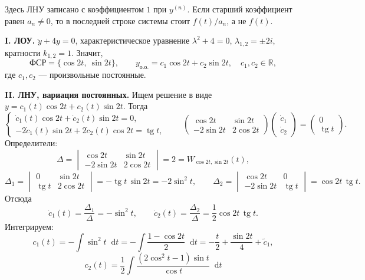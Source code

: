 \documentclass[12pt,a4paper]{article}
\numberwithin{equation}{section}
\newcommand{\R}{\mathbb{R}}
\newcommand{\dd}{\mathop{}\!\mathrm{d}}
\begin{document}
\begin{remarkHSE}
Здесь ЛНУ записано с коэффициентом \(1\) при \(y^{(n)}\). Если старший коэффициент равен \(a_n\neq0\), то в последней строке системы стоит \(f(t)/a_n\), а не \(f(t)\).
\end{remarkHSE}

\begin{exampleHSE}[№\,578: \(\ddot y+4y=\operatorname{tg}t\)]
\textbf{I. ЛОУ.} \(\ddot y+4y=0\), характеристическое уравнение \(\lambda^2+4=0\), \(\lambda_{1,2}=\pm2i\), кратности \(k_{1,2}=1\). Значит,
\[
\text{ФСР}=\{\cos2t,\ \sin2t\},\qquad
y_{\text{о.о.}}=c_1\cos2t+c_2\sin2t,\quad c_1,c_2\in\R,
\]
где \(c_1,c_2\) --- произвольные постоянные.

\textbf{II. ЛНУ, вариация постоянных.} Ищем решение в виде \(y=c_1(t)\cos2t+c_2(t)\sin2t\). Тогда
\[
\begin{cases}
\dot c_1(t)\cos2t+\dot c_2(t)\sin2t=0,\\
-2\dot c_1(t)\sin2t+2\dot c_2(t)\cos2t=\operatorname{tg}t,
\end{cases}
\qquad
\begin{pmatrix}\cos2t&\sin2t\\-2\sin2t&2\cos2t\end{pmatrix}
\begin{pmatrix}\dot c_1\\\dot c_2\end{pmatrix}
=\begin{pmatrix}0\\\operatorname{tg}t\end{pmatrix}.
\]
Определители:
\[
\Delta=\begin{vmatrix}\cos2t&\sin2t\\-2\sin2t&2\cos2t\end{vmatrix}=2=W_{\cos2t,\sin2t}(t),
\]
\[
\Delta_1=\begin{vmatrix}0&\sin2t\\\operatorname{tg}t&2\cos2t\end{vmatrix}=-\operatorname{tg}t\,\sin2t=-2\sin^2t,
\qquad
\Delta_2=\begin{vmatrix}\cos2t&0\\-2\sin2t&\operatorname{tg}t\end{vmatrix}=\cos2t\,\operatorname{tg}t.
\]
Отсюда
\[
\dot c_1(t)=\frac{\Delta_1}{\Delta}=-\sin^2t,\qquad
\dot c_2(t)=\frac{\Delta_2}{\Delta}=\frac12\cos2t\,\operatorname{tg}t.
\]
Интегрируем:
\[
c_1(t)=-\int\sin^2t\dd t=-\int\frac{1-\cos2t}{2}\dd t=-\frac t2+\frac{\sin2t}{4}+\tilde c_1,
\]
\[
c_2(t)=\frac12\int\frac{(2\cos^2t-1)\sin t}{\cos t}\dd t
\]
\end{exampleHSE}
\end{document}

